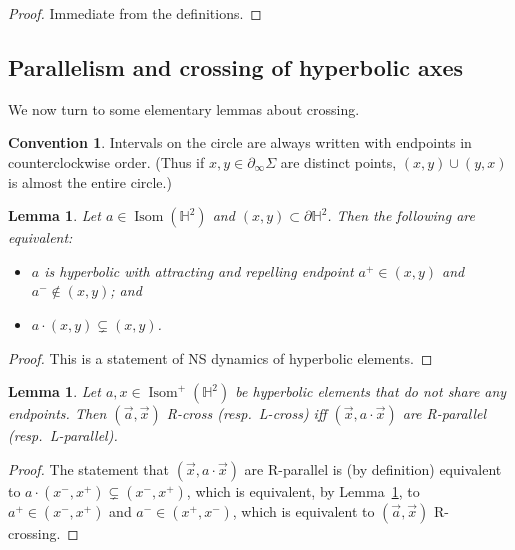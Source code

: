 \documentclass[11pt]{amsart}
\newcommand{\ora}[1]{\overrightarrow{#1}}
\numberwithin{equation}{section}
\numberwithin{figure}{section}
\newtheorem{lemma}[theorem]{Lemma}
\theoremstyle{definition}
\newtheorem{convention}[theorem]{Convention}
\theoremstyle{plain}
\newcommand\bbH{\ensuremath{\mathbb{H}}}
\DeclareMathOperator{\Isom}{Isom}
\begin{document}
\begin{proof}
  Immediate from the definitions.
\end{proof}

\subsection{Parallelism and crossing of hyperbolic axes}
\label{subsec:parallel_crossing}
We now turn to some elementary lemmas about crossing.

\begin{convention}\label{conv:circle-intervals}
  Intervals on the circle are always written with endpoints in counterclockwise
  order. (Thus if $x,y \in \partial_{\infty} \Sigma$ are distinct points,
  $(x,y) \cup (y,x)$ is almost the entire circle.)
\end{convention}

\begin{lemma}\label{lem:NS-dynamics}
  Let $a \in \Isom(\bbH^2)$ and $(x,y) \subset \partial\bbH^2$. Then
  the following are equivalent:
  \begin{itemize}
  \item $a$ is hyperbolic with attracting and repelling
    endpoint $a^+ \in(x,y)$ and $a^- \notin (x,y)$; and
  \item  $a \cdot (x,y) \subsetneq (x,y)$.
  \end{itemize}
\end{lemma}

\begin{proof}
  This is a statement of NS dynamics of hyperbolic elements.
\end{proof}

\begin{lemma}
  Let $a,x \in \Isom^+(\bbH^2)$ be hyperbolic elements that do not share any endpoints.
  Then $(\ora{a},\ora{x})$ R-cross (resp.\ L-cross) iff
  $(\ora{x}, a \cdot \ora{x})$ are R-parallel (resp.\ L-parallel).
 \label{lem:rhs}
\end{lemma}
\begin{proof}
  The statement that $(\ora{x}, a\cdot\ora{x})$ are R-parallel is (by
  definition) equivalent to $a\cdot(x^-,x^+) \subsetneq (x^-,x^+)$,
  which is equivalent, by Lemma~\ref{lem:NS-dynamics}, to $a^+ \in (x^-,x^+)$ and
  $a^- \in (x^+,x^-)$, which is equivalent to
  $(\ora{a},\ora{x})$ R-crossing.
\end{proof}
\end{document}
